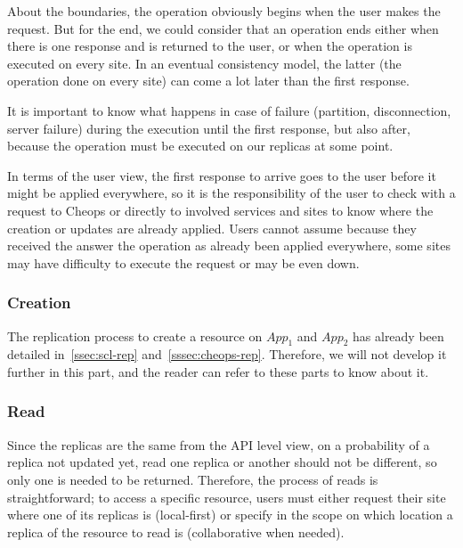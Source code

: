 About the boundaries, the operation obviously begins when the user makes
the request.
%
But for the end, we could consider that an operation ends either when
there is one response and is returned to the user, or when the
operation is executed on every site.
%
In an eventual consistency model, the latter (the operation done on
every site) can come a lot later than the first response.
%

%
It is important to know what happens in case of failure (partition,
disconnection, server failure) during the execution until the first
response, but also after, because the operation must be executed on
our replicas at some point.


In terms of the user view, the first response to arrive goes to the
user before it might be applied everywhere, so it is the
responsibility of the user to check with a request to Cheops or
directly to involved services and sites to know where the creation or
updates are already applied.
%
Users cannot assume because they received the answer the operation as
already been applied everywhere, some sites may have difficulty to
execute the request or may be even down.


\subsubsection{Creation}

The replication process to create a resource on $App_1$ and $App_2$
has already been detailed in~\autoref{ssec:scl-rep}
and~\autoref{sssec:cheops-rep}.
%
Therefore, we will not develop it further in this part, and the reader
can refer to these parts to know about it.




\subsubsection{Read}

%
Since the replicas are the same from the API level view, on a
probability of a replica not updated yet, read one replica or another
should not be different, so only one is needed to be returned.
%
Therefore, the process of reads is straightforward; to access a
specific resource, users must either request their site where one of
its replicas is (local-first) or specify in the scope on which
location a replica of the resource to read is (collaborative when
needed).





